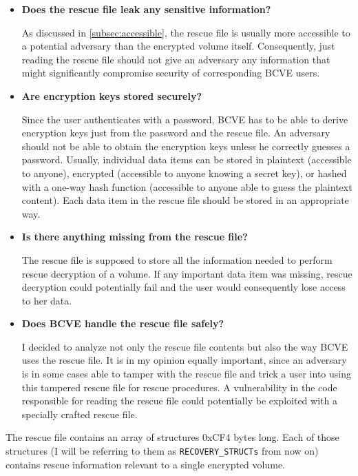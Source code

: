 \documentclass[thesis=B,english]{FITthesis}[2012/10/20]
\begin{document}
	\begin{itemize}
		\item \textbf{Does the rescue file leak any sensitive information?}
		
		As discussed in \cref{subsec:accessible}, the rescue file is usually more accessible to a potential adversary than the encrypted volume itself.  Consequently, just reading the rescue file should not give an adversary any information that might significantly compromise security of corresponding BCVE users.
		
		\item \textbf{Are encryption keys stored securely?}
		
		Since the user authenticates with a password, BCVE has to be able to derive encryption keys just from the password and the rescue file. An adversary should not be able to obtain the encryption keys unless he correctly guesses a password. Usually, individual data items can be stored in plaintext (accessible to anyone), encrypted (accessible to anyone knowing a secret key), or hashed with a one-way hash function (accessible to anyone able to guess the plaintext content). Each data item in the rescue file should be stored in an appropriate way.
		
		\item \textbf{Is there anything missing from the rescue file?}\nopagebreak{}
	
		
		The rescue file is supposed to store all the information needed to perform rescue decryption of a volume. If any important data item was missing, rescue decryption could potentially fail and the user would consequently lose access to her data.
		
		\item \textbf{Does BCVE handle the rescue file safely?}
		
		I decided to analyze not only the rescue file contents but also the way BCVE uses the rescue file. It is in my opinion equally important, since an adversary is in some cases able to tamper with the rescue file and trick a user into using this tampered rescue file for rescue procedures. A vulnerability in the code responsible for reading the rescue file could potentially be exploited with a specially crafted rescue file.
		
	\end{itemize}
	
	The rescue file contains an array of structures 0xCF4 bytes long. Each of those structures (I will be referring to them as \verb|RECOVERY_STRUCTs| from now on) contains rescue information relevant to a single encrypted volume. 
	
\end{document}
